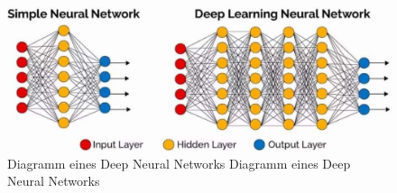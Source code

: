 \documentclass[a4paper,11pt]{article}
\theoremstyle{mytheor}
\begin{document}
\begin{figure}
	\includegraphics[width=1\textwidth]{deep-learning.jpg}
	\caption [Diagramm eines Deep Neural Networks]{Diagramm eines Deep Neural Networks Diagramm eines Deep Neural Networks}
	\end{figure}
	
\end{document}
